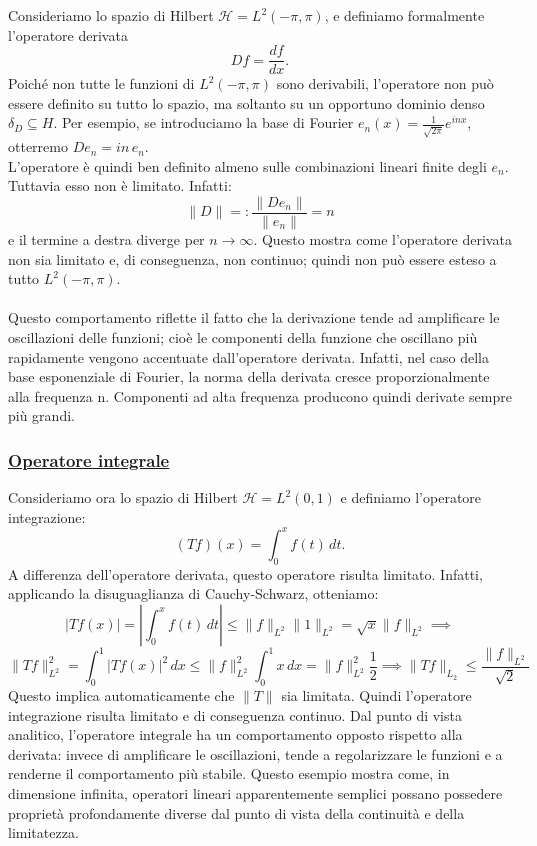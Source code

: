 \documentclass[a4paper,12pt]{report}
\begin{document}
Consideriamo lo spazio di Hilbert $\mathscr{H}=L^2(-\pi,\pi)$, e definiamo formalmente l’operatore derivata
\[
Df=\frac{df}{dx}.
\]
Poiché non tutte le funzioni di $L^2(-\pi,\pi)$ sono derivabili, l’operatore non può essere definito su tutto lo spazio, ma soltanto su un opportuno dominio denso $\delta_D\subseteq H$. Per esempio, se introduciamo la base di Fourier $e_n(x)=\frac1{\sqrt{2\pi}}e^{inx}$, otterremo $De_n=in\,e_n$.
\\L’operatore è quindi ben definito almeno sulle combinazioni lineari finite degli $e_n$. Tuttavia esso non è limitato. Infatti:
\[
\|D\|=:\frac{\|De_n\|}{\|e_n\|}=n
\]
e il termine a destra diverge per $n\to\infty$. Questo mostra come l'operatore derivata non sia limitato e, di conseguenza, non continuo; quindi non può essere esteso a tutto $L^2(-\pi,\pi)$.
\\
\\Questo comportamento riflette il fatto che la derivazione tende ad amplificare le oscillazioni delle funzioni; cioè le componenti della funzione che oscillano più rapidamente vengono accentuate dall’operatore derivata. Infatti, nel caso della base esponenziale di Fourier, la norma della derivata cresce proporzionalmente alla frequenza n. Componenti ad alta frequenza producono quindi derivate sempre più grandi.

\subsubsection{\underline{Operatore integrale}}

Consideriamo ora lo spazio di Hilbert $\mathscr{H}=L^2(0,1)$ e definiamo l'operatore integrazione:
\[
(Tf)(x)=\int_0^x f(t)\,dt.
\]
A differenza dell’operatore derivata, questo operatore risulta limitato. Infatti, applicando la disuguaglianza di Cauchy-Schwarz, otteniamo:
\[
|Tf(x)|
=
\left|\int_0^x f(t)\,dt\right|
\le
\|f\|_{L^2}\|1\|_{L^2}
=
\sqrt{x}\|f\|_{L^2}
\implies\]
\[
\|Tf\|_{L^2}^2
=
\int_0^1 |Tf(x)|^2\,dx
\le
\|f\|_{L^2}^2 \int_0^1 x\,dx=\|f\|^2_{L^2}\frac{1}{2}\implies\|Tf\|_{L_2}\leq \frac{\|f\|_{L^2}}{\sqrt{2}}
\]
Questo implica automaticamente che $\|T\|$ sia limitata. Quindi l'operatore integrazione risulta limitato e di conseguenza continuo. Dal punto di vista analitico, l’operatore integrale ha un comportamento opposto rispetto alla derivata: invece di amplificare le oscillazioni, tende a regolarizzare le funzioni e a renderne il comportamento più stabile. Questo esempio mostra come, in dimensione infinita, operatori lineari apparentemente semplici possano possedere proprietà profondamente diverse dal punto di vista della continuità e della limitatezza.
\end{document}
